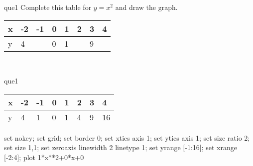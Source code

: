 \documentclass[13.5pt, varwidth=true]{beamer}
\begin{document}
\begin{frame}[shrink=19,fragile]
	\begin{beamercolorbox}[rounded=true, left, shadow=true,wd=14.8cm]{que1}
		 Complete this table for $y = x^{2}$ and draw the graph. \\[0.3cm] \renewcommand{\arraystretch}{1.2}\begin{tabular}{|C|C|C|C|C|C|C|C|} \hline x & -2 & -1 & 0 & 1 & 2 & 3 & 4 \\ \hline y & 4 &  & 0 & 1 &  & 9 & \\ \hline \end{tabular}\\[0.3cm]
	\end{beamercolorbox}
\end{frame}
\begin{frame}[shrink=19,fragile]
	\begin{beamercolorbox}[rounded=true, left, shadow=true,wd=14.8cm]{que1}
		\renewcommand{\arraystretch}{1.2}\begin{tabular}{|C|C|C|C|C|C|C|C|} \hline x & -2 & -1 & 0 & 1 & 2 & 3 & 4 \\ \hline y & 4 & 1 & 0 & 1 & 4 & 9 & 16\\ \hline \end{tabular}\begin{gnuplot}[terminal=pdf] set nokey; set grid; set border 0; set xtics axis 1; set ytics axis 1; set size ratio 2; set size 1,1; set zeroaxis linewidth 2 linetype 1; set yrange [-1:16]; set xrange [-2:4]; plot 1*x**2+0*x+0 \end{gnuplot}
	\end{beamercolorbox}
\end{frame}
\end{document}
